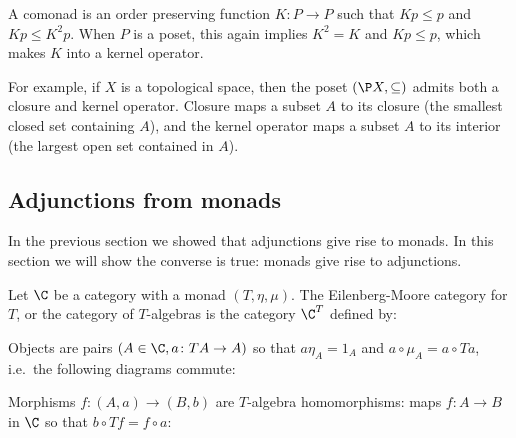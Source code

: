     A comonad is an order preserving function $K\colon P\to P$ such that $Kp\leq p$ and $Kp\leq K^2p$.
    When $P$ is a poset, this again implies $K^2=K$ and $Kp\leq p$, which makes $K$ into a {\emphcolor kernel operator}.

    For example, if $X$ is a topological space, then the poset $(\P X,\subseteq)$ admits both a closure and kernel operator.
    Closure maps a subset $A$ to its closure (the smallest closed set containing $A$), and the kernel operator maps a subset $A$ to its interior (the largest open set
    contained in $A$).

\eexam

\subsection{Adjunctions from monads}

In the previous section we showed that adjunctions give rise to monads.
In this section we will show the converse is true: monads give rise to adjunctions.

\bdefn

    Let $\C$ be a category with a monad $(T,\eta,\mu)$.
    The {\emphcolor Eilenberg-Moore category} for $T$, or the {\emphcolor category of $T$-algebras} is the category $\C^T$ defined by:
    \benum
        \item Objects are pairs $(A\in\C,a\colon TA\to A)$ so that $a\eta_A=1_A$ and $a\circ\mu_A=a\circ Ta$, i.e.\ the following diagrams commute:

        \centerline{\hfil{}}

        \item Morphisms $f\colon(A,a)\to(B,b)$ are $T$-algebra {\emphcolor homomorphisms}: maps $f\colon A\to B$ in $\C$ so that $b\circ Tf=f\circ a$:

        \centerline{}
    \eenum


